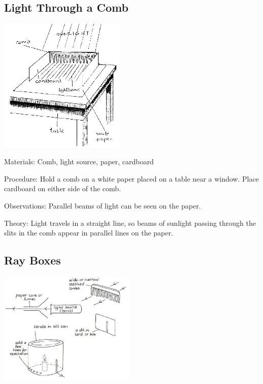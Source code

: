 \begin{multicols}{2}
\vfill
\columnbreak

\subsection{Light Through a Comb}

\begin{center}
\includegraphics[width=0.45\textwidth]{./img/source/light-comb.png}
\end{center}

\begin{description*}
\item[Materials:]{Comb, light source, paper, cardboard}
\item[Procedure:]{Hold a comb on a white paper placed on a table near a window. Place cardboard on either side of the comb.}
\item[Observations:]{Parallel beams of light can be seen on the paper.}
\item[Theory:]{Light travels in a straight line, so beams of sunlight passing through the slits in the comb appear in parallel lines on the paper.}
\end{description*}

\subsection{Ray Boxes}

\begin{center}
\includegraphics[width=0.49\textwidth]{./img/vso/ray-boxes.jpg}
\end{center}


\end{multicols}
